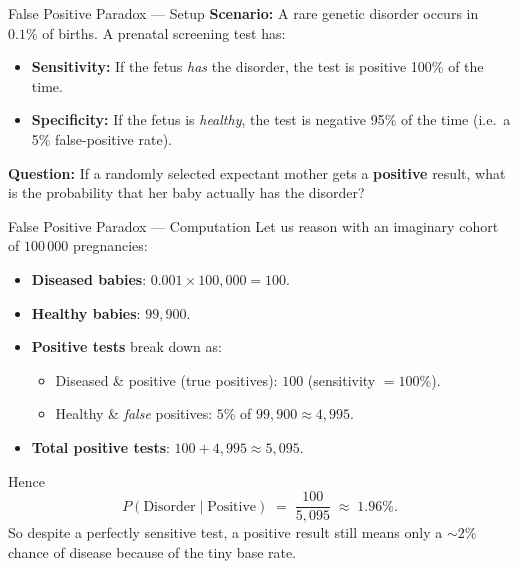 \documentclass[aspectratio=169,11pt]{beamer} %
\begin{document}
\begin{frame}{False Positive Paradox --- Setup}
\textbf{Scenario:} A rare genetic disorder occurs in $0.1\%$ of births.  
A prenatal screening test has:
\begin{itemize}
    \item \textbf{Sensitivity:} If the fetus \emph{has} the disorder, the test is positive 100\% of the time.
    \item \textbf{Specificity:} If the fetus is \emph{healthy}, the test is negative 95\% of the time (i.e.\ a 5\% false-positive rate).
\end{itemize}
\textbf{Question:} If a randomly selected expectant mother gets a \textbf{positive} result, what is the probability that her baby actually has the disorder?
\end{frame}

\begin{frame}{False Positive Paradox --- Computation}
Let us reason with an imaginary cohort of $100\,000$ pregnancies:
\begin{itemize}
    \item \textbf{Diseased babies}: $0.001 \times 100{,}000 = 100$.
    \item \textbf{Healthy babies}: $99{,}900$.
    \item \textbf{Positive tests} break down as:
    \begin{itemize}
        \item Diseased \& positive (true positives): $100$ (sensitivity $=100\%$).
        \item Healthy \& \emph{false} positives: $5\%$ of $99{,}900 \approx 4{,}995$.
    \end{itemize}
    \item \textbf{Total positive tests}: $100 + 4{,}995 \approx 5{,}095$.
\end{itemize}
Hence
\[
P(\text{Disorder}\mid\text{Positive}) \;=\; \frac{100}{5{,}095} \;\approx\; 1.96\%.
\]
So despite a perfectly sensitive test, a positive result still means only a $\sim2\%$ chance of disease because of the tiny base rate.
\end{frame}
\end{document}
